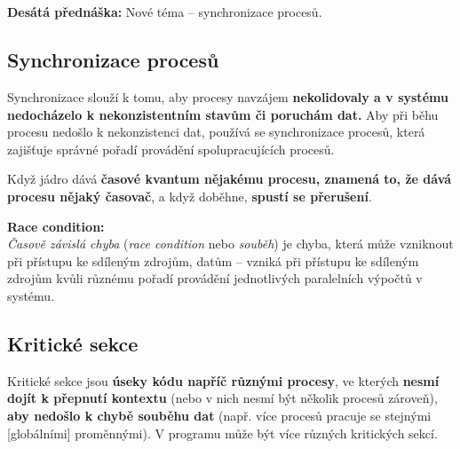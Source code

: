 \documentclass[a4paper, 11pt]{article}
\begin{document}
\newpage

\section{}
\textbf{Desátá přednáška:} Nové téma -- synchronizace procesů.

\subsection{Synchronizace procesů} \label{synchronizace-procesu}
Synchronizace slouží k tomu, aby procesy navzájem \textbf{nekolidovaly a v systému nedocházelo k nekonzistentním stavům či poruchám dat.} Aby při běhu procesu nedošlo k nekonzistenci dat, používá se synchronizace procesů, která zajišťuje správné pořadí provádění spolupracujících procesů.
 
Když jádro dává \textbf{časové kvantum nějakému procesu, znamená to, že dává procesu nějaký časovač}, a když doběhne, \textbf{spustí se přerušení}.
 
\textbf{Race condition:} \\
\emph{Časově závislá chyba} (\emph{race condition} nebo \emph{souběh}) je chyba, která může vzniknout při přístupu ke sdíleným zdrojům, datům -- vzniká při přístupu ke sdíleným zdrojům kvůli různému pořadí provádění jednotlivých paralelních výpočtů v systému.

\subsection{Kritické sekce}
Kritické sekce jsou \textbf{úseky kódu napříč různými procesy}, ve kterých \textbf{nesmí dojít k přepnutí kontextu} (nebo v nich nesmí být několik procesů zároveň), \textbf{aby nedošlo k chybě souběhu dat} (např. více procesů pracuje se stejnými [globálními] proměnnými). V programu může být více různých kritických sekcí.
 
\end{document}
